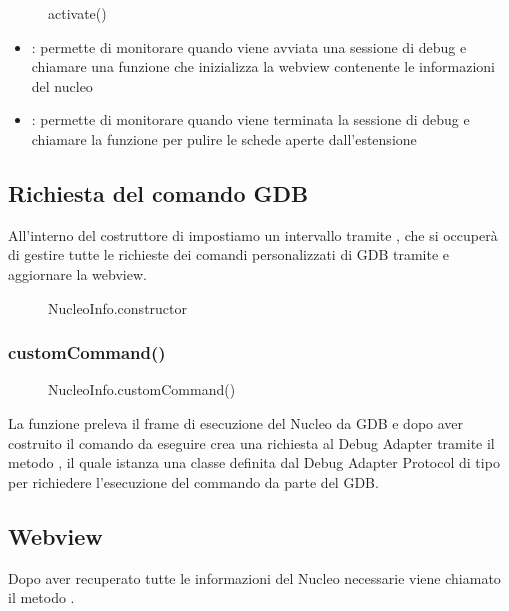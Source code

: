 \begin{figure}[H]
    
    \caption{activate()}
\end{figure}


\begin{itemize}
    \item {}: permette di monitorare quando viene avviata una sessione di debug e chiamare una funzione che inizializza la webview contenente le informazioni del nucleo
    \item {}: permette di monitorare quando viene terminata la sessione di debug e chiamare la funzione per pulire le schede aperte dall'estensione
\end{itemize}

\subsection{Richiesta del comando GDB}
All'interno del costruttore di  impostiamo un intervallo tramite \linebreak {}, che si occuperà di gestire tutte le richieste dei comandi personalizzati di GDB tramite  e aggiornare la webview. 

\begin{figure}[H]
    
    \caption{NucleoInfo.constructor}
\end{figure}

\subsubsection{customCommand()}
\begin{figure}[H]
    
    \caption{NucleoInfo.customCommand()}
\end{figure}

La funzione  preleva il frame di esecuzione del Nucleo da GDB e dopo aver costruito il comando da eseguire crea una richiesta al Debug Adapter tramite il metodo , il quale istanza una classe  definita dal Debug Adapter Protocol di tipo  per richiedere l'esecuzione del commando da parte del GDB. 

\subsection{Webview}
Dopo aver recuperato tutte le informazioni del Nucleo necessarie viene chiamato il metodo . 

